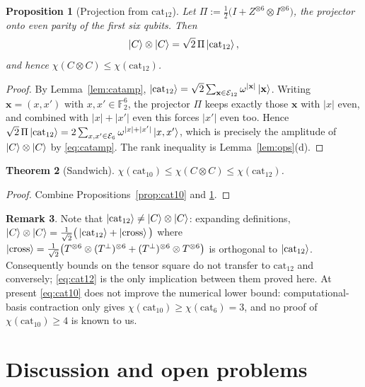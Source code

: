\documentclass[11pt]{article}
\theoremstyle{plain}
\newtheorem{theorem}{Theorem}[section]
\newtheorem{proposition}[theorem]{Proposition}
\theoremstyle{definition}
\newtheorem{remark}[theorem]{Remark}
\newcommand{\F}{\mathbb{F}}
\newcommand{\cat}{\mathrm{cat}}
\newcommand{\Ev}{\mathcal{E}}
\newcommand{\wt}[1]{\lvert #1\rvert}
\begin{document}
\begin{proposition}[Projection from $\cat_{12}$]\label{prop:cat12}
Let $\Pi:=\frac12\big(I+Z^{\otimes6}\otimes I^{\otimes6}\big)$, the projector onto even
parity of the first six qubits. Then
\begin{equation}\label{eq:cat12}
\ket C\otimes\ket C=\sqrt2\,\Pi\ket{\cat_{12}},
\end{equation}
and hence $\chi(C\otimes C)\le\chi(\cat_{12})$.
\end{proposition}

\begin{proof}
By Lemma~\ref{lem:catamp}, $\ket{\cat_{12}}=\sqrt2\sum_{\mathbf x\in\Ev_{12}}\omega^{\wt{\mathbf x}}\ket{\mathbf x}$.
Writing $\mathbf x=(x,x')$ with $x,x'\in\F_2^6$, the projector $\Pi$ keeps exactly those $\mathbf x$
with $\wt x$ even, and combined with $\wt x+\wt{x'}$ even this forces $\wt{x'}$ even
too. Hence
$\sqrt2\,\Pi\ket{\cat_{12}}=2\sum_{x,x'\in\Ev_6}\omega^{\wt x+\wt{x'}}\ket{x,x'}$,
which is precisely the amplitude of $\ket C\otimes\ket C$ by \eqref{eq:catamp}. The rank
inequality is Lemma~\ref{lem:ops}(d).
\end{proof}

\begin{theorem}[Sandwich]\label{thm:sandwich}
$\chi(\cat_{10})\le\chi(C\otimes C)\le\chi(\cat_{12})$.
\end{theorem}

\begin{proof}
Combine Propositions~\ref{prop:cat10} and \ref{prop:cat12}.
\end{proof}

\begin{remark}
Note that $\ket{\cat_{12}}\ne\ket C\otimes\ket C$: expanding definitions,
$\ket C\otimes\ket C=\frac1{\sqrt2}\big(\ket{\cat_{12}}+\ket{\mathrm{cross}}\big)$ where
$\ket{\mathrm{cross}}=\frac1{\sqrt2}\big(T^{\otimes6}\otimes(T^\perp)^{\otimes6}
+(T^\perp)^{\otimes6}\otimes T^{\otimes6}\big)$ is orthogonal to $\ket{\cat_{12}}$.
Consequently bounds on the tensor square do not transfer to $\cat_{12}$ and conversely;
\eqref{eq:cat12} is the only implication between them proved here. At present
\eqref{eq:cat10} does not improve the numerical lower bound: computational-basis
contraction only gives $\chi(\cat_{10})\ge\chi(\cat_6)=3$, and no proof of
$\chi(\cat_{10})\ge4$ is known to us.
\end{remark}

\section{Discussion and open problems}\label{sec:open}
\end{document}
